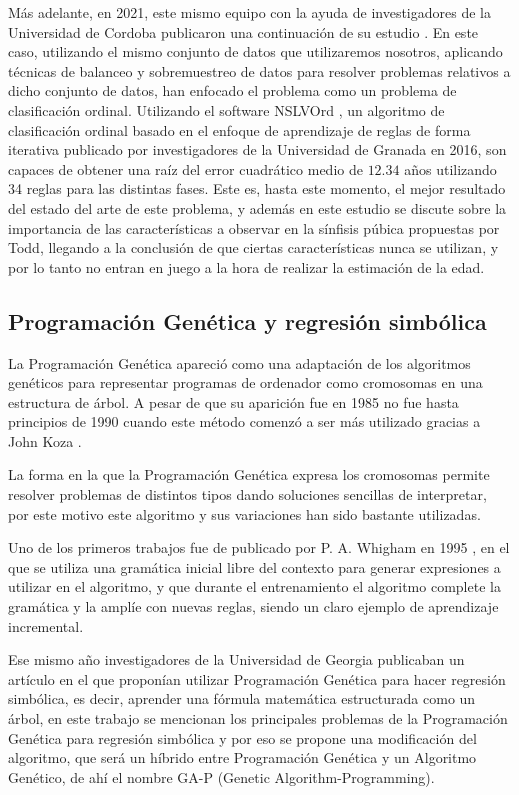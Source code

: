 Más adelante, en 2021, este mismo equipo con la ayuda de investigadores de la Universidad de Cordoba publicaron una continuación de su estudio \cite{NSLVOrdAge}. En este caso, utilizando el mismo conjunto de datos que utilizaremos nosotros, aplicando técnicas de balanceo y sobremuestreo de datos para resolver problemas relativos a dicho conjunto de datos, han enfocado el problema como un problema de clasificación ordinal. Utilizando el software NSLVOrd \cite{NSLVOrd}, un algoritmo de clasificación ordinal basado en el enfoque de aprendizaje de reglas de forma iterativa publicado por investigadores de la Universidad de Granada en 2016, son capaces de obtener una raíz del error cuadrático medio de $12.34$ años utilizando 34 reglas para las distintas fases. Este es, hasta este momento, el mejor resultado del estado del arte de este problema, y además en este estudio se discute sobre la importancia de las características a observar en la sínfisis púbica propuestas por Todd, llegando a la conclusión de que ciertas características nunca se utilizan, y por lo tanto no entran en juego a la hora de realizar la estimación de la edad.

\subsection{Programación Genética y regresión simbólica}

La Programación Genética apareció como una adaptación de los algoritmos genéticos para representar programas de ordenador como cromosomas en una estructura de árbol. A pesar de que su aparición fue en 1985 no fue hasta principios de 1990 cuando este método comenzó a ser más utilizado gracias a John Koza \cite{kozaGP}.

La forma en la que la Programación Genética expresa los cromosomas permite resolver problemas de distintos tipos dando soluciones sencillas de interpretar, por este motivo este algoritmo y sus variaciones han sido bastante utilizadas.

Uno de los primeros trabajos fue de publicado por P. A. Whigham en 1995 \cite{PGgramaticas}, en el que se utiliza una gramática inicial libre del contexto para generar expresiones a utilizar en el algoritmo, y que durante el entrenamiento el algoritmo complete la gramática y la amplíe con nuevas reglas, siendo un claro ejemplo de aprendizaje incremental.

Ese mismo año investigadores de la Universidad de Georgia publicaban un artículo \cite{primerGAP} en el que proponían utilizar Programación Genética para hacer regresión simbólica, es decir, aprender una fórmula matemática estructurada como un árbol, en este trabajo se mencionan los principales problemas de la Programación Genética para regresión simbólica y por eso se propone una modificación del algoritmo, que será un híbrido entre Programación Genética y un Algoritmo Genético, de ahí el nombre GA-P (Genetic Algorithm-Programming).


